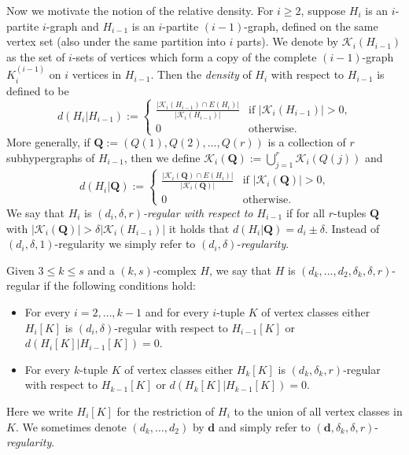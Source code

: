 \documentclass[11pt, reqno]{amsart}    	%
\theoremstyle{definition}
\numberwithin{equation}{section}
\begin{document}
	Now we motivate the notion of the relative density.
	For $i \geq 2$, suppose $H_i$ is an $i$-partite $i$-graph and $H_{i-1}$ is an $i$-partite $(i-1)$-graph, defined on the same vertex set (also under the same partition into $i$ parts). 
	We denote by $\mathcal{K}_i(H_{i-1})$ as the set of $i$-sets of vertices which form a copy of the complete $(i-1)$-graph $K^{(i-1)}_i$ on $i$ vertices in $H_{i-1}$. Then the \emph{density} of $H_i$ with respect to $H_{i-1}$ is defined to be
	\[ d(H_i|H_{i-1}):=\begin{cases}
		\frac{|\mathcal{K}_i(H_{i-1})\cap E(H_i)|}{|\mathcal{K}_i(H_{i-1})|} & \text{if $|\mathcal{K}_i(H_{i-1})|>0$,} \\
		0 & \text{otherwise.}
	\end{cases}
	\]
	More generally, if $\mathbf{Q} := (Q(1), Q(2),\dots, Q(r))$ is a collection of $r$ subhypergraphs of $H_{i-1}$, then we define $\mathcal{K}_i(\mathbf{Q}):= \bigcup^r_{j=1}\mathcal{K}_i(Q(j))$ and
	\[ d(H_i|\mathbf{Q}):=\begin{cases}
		\frac{|\mathcal{K}_i(\mathbf{Q})\cap E(H_i)|}{|\mathcal{K}_i(\mathbf{Q})|} & \text{if $|\mathcal{K}_i(\mathbf{Q})|>0$,} \\
		0 & \text{otherwise.}
	\end{cases}
	\]
	We say that $H_i$ is \emph{$(d_i, \delta, r)$-regular with respect to $H_{i-1}$} if for all $r$-tuples $\mathbf{Q}$ with $|\mathcal{K}_i(\mathbf{Q})| > \delta|\mathcal{K}_i(H_{i-1})|$ it holds that $d(H_i|\mathbf{Q}) = d_i \pm \delta$. Instead of $(d_i, \delta, 1)$-regularity we simply refer to $(d_i, \delta)$-\emph{regularity}.
	
	Given $3 \leq k \leq s$ and a $(k, s)$-complex $H$, we say that $H$ is $(d_k, \dots , d_2, \delta_k, \delta, r)$-regular if the following conditions hold:\vspace{3mm}
	
	\begin{itemize}
		\item For every $i = 2, \dots , k-1$ and for every $i$-tuple $K$ of vertex classes either $H_i[K]$ is $(d_i, \delta)$-regular with respect to $H_{i-1}[K]$ or $d(H_i[K]|H_{i-1}[K]) = 0$.
		\item For every $k$-tuple $K$ of vertex classes either $H_k[K]$ is $(d_k, \delta_k, r)$-regular with respect to $H_{k-1}[K]$ or $d(H_k[K]|H_{k-1}[K]) = 0$.
	\end{itemize}
	\vspace{3mm}
	Here we write $H_i[K]$ for the restriction of $H_i$ to the union of all vertex classes in $K$. We sometimes denote $(d_k, \dots , d_2)$ by $\mathbf{d}$ and simply refer to $(\mathbf{d}, \delta_k, \delta, r)$-\emph{regularity}.
	
\end{document}
